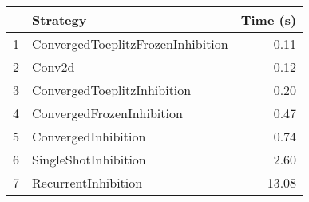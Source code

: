 \begin{tabular}{llr}
\toprule
{} &                           Strategy & Time (s) \\
\midrule
1 &  ConvergedToeplitzFrozenInhibition &     0.11 \\
2 &                             Conv2d &     0.12 \\
3 &        ConvergedToeplitzInhibition &     0.20 \\
4 &          ConvergedFrozenInhibition &     0.47 \\
5 &                ConvergedInhibition &     0.74 \\
6 &               SingleShotInhibition &     2.60 \\
7 &                RecurrentInhibition &    13.08 \\
\bottomrule
\end{tabular}
